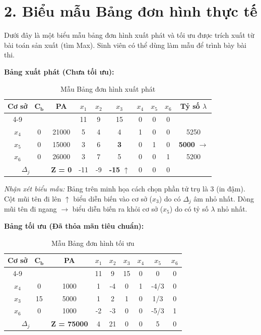 \newpage
\section*{2. Biểu mẫu Bảng đơn hình thực tế}
Dưới đây là một biểu mẫu bảng đơn hình xuất phát và tối ưu được trích xuất từ bài toán sản xuất (tìm Max). Sinh viên có thể dùng làm mẫu để trình bày bài thi.

\textbf{Bảng xuất phát (Chưa tối ưu):}
\begin{table}[htbp]
    \centering
    \renewcommand{\arraystretch}{1.3}
    \begin{tabular}{|c|c|c|c|c|c|c|c|c|c|}
        \hline
        \multirow{2}{*}{\textbf{Cơ sở}} & \multirow{2}{*}{$\mathbf{C_b}$} & \multirow{2}{*}{\textbf{PA}} & $x_1$ & $x_2$ & $x_3$ & $x_4$ & $x_5$ & $x_6$ & \multirow{2}{*}{\textbf{Tỷ số $\lambda$}} \\
        \cline{4-9}
        & & & 11 & 9 & 15 & 0 & 0 & 0 & \\
        \hline
        $x_4$ & 0 & 21000 & 5 & 4 & 4 & 1 & 0 & 0 & 5250 \\
        \hline
        $x_5$ & 0 & 15000 & 3 & 6 & \textbf{3} & 0 & 1 & 0 & \textbf{5000} $\rightarrow$ \\
        \hline
        $x_6$ & 0 & 26000 & 3 & 7 & 5 & 0 & 0 & 1 & 5200 \\
        \hline
        \multicolumn{2}{|c|}{$\Delta_j$} & \textbf{Z = 0} & -11 & -9 & \textbf{-15} $\uparrow$ & 0 & 0 & 0 & \\
        \hline
    \end{tabular}
    \caption{Mẫu Bảng đơn hình xuất phát}
\end{table}

\textit{Nhận xét biểu mẫu:} Bảng trên minh họa cách chọn phần tử trụ là $3$ (in đậm). Cột mũi tên đi lên $\uparrow$ biểu diễn biến vào cơ sở ($x_3$) do có $\Delta_j$ âm nhỏ nhất. Dòng mũi tên đi ngang $\rightarrow$ biểu diễn biến ra khỏi cơ sở ($x_5$) do có tỷ số $\lambda$ nhỏ nhất.

\vspace{0.5cm}
\textbf{Bảng tối ưu (Đã thỏa mãn tiêu chuẩn):}
\begin{table}[htbp]
    \centering
    \renewcommand{\arraystretch}{1.3}
    \begin{tabular}{|c|c|c|c|c|c|c|c|c|}
        \hline
        \multirow{2}{*}{\textbf{Cơ sở}} & \multirow{2}{*}{$\mathbf{C_b}$} & \multirow{2}{*}{\textbf{PA}} & $x_1$ & $x_2$ & $x_3$ & $x_4$ & $x_5$ & $x_6$ \\
        \cline{4-9}
        & & & 11 & 9 & 15 & 0 & 0 & 0 \\
        \hline
        $x_4$ & 0 & 1000 & 1 & -4 & 0 & 1 & -4/3 & 0 \\
        \hline
        $x_3$ & 15 & 5000 & 1 & 2 & 1 & 0 & 1/3 & 0 \\
        \hline
        $x_6$ & 0 & 1000 & -2 & -3 & 0 & 0 & -5/3 & 1 \\
        \hline
        \multicolumn{2}{|c|}{$\Delta_j$} & \textbf{Z = 75000} & 4 & 21 & 0 & 0 & 5 & 0 \\
        \hline
    \end{tabular}
    \caption{Mẫu Bảng đơn hình tối ưu}
\end{table}

